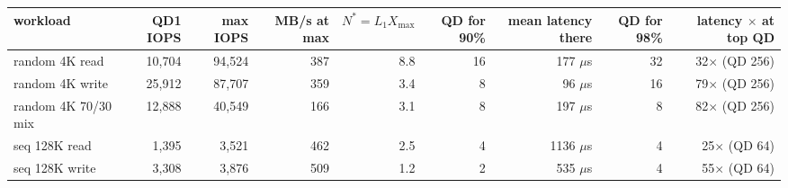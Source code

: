 \begin{tabular}{lrrrrrrrr}
\toprule
workload & QD1 IOPS & max IOPS & MB/s at max & $N^{*}=L_1 X_{\max}$ & QD for 90\% & mean latency there & QD for 98\% & latency $\times$ at top QD \\
\midrule
random 4K read & 10,704 & 94,524 & 387 & 8.8 & 16 & 177 $\mu$s & 32 & 32$\times$ (QD 256) \\
random 4K write & 25,912 & 87,707 & 359 & 3.4 & 8 & 96 $\mu$s & 16 & 79$\times$ (QD 256) \\
random 4K 70/30 mix & 12,888 & 40,549 & 166 & 3.1 & 8 & 197 $\mu$s & 8 & 82$\times$ (QD 256) \\
seq 128K read & 1,395 & 3,521 & 462 & 2.5 & 4 & 1136 $\mu$s & 4 & 25$\times$ (QD 64) \\
seq 128K write & 3,308 & 3,876 & 509 & 1.2 & 2 & 535 $\mu$s & 4 & 55$\times$ (QD 64) \\
\bottomrule
\end{tabular}
